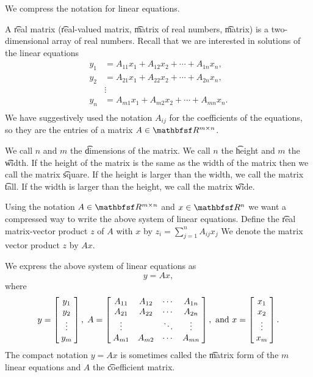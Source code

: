 
We compress the notation for linear equations.

A \t{real matrix} (\t{real-valued matrix}, \t{matrix of real numbers}, \t{matrix}) is a two-dimensional array of real numbers.
Recall that we are interested in solutions of the linear equations
  \[
\begin{aligned}
y_1 &= A_{11}x_1 + A_{12}x_2 + \cdots + A_{1n}x_n, \\
y_2 &= A_{21}x_1 + A_{22}x_2 + \cdots + A_{2n}x_n, \\
&\vdots \\
y_n &= A_{m1}x_1 + A_{m2}x_2 + \cdots + A_{mn}x_n. \\
\end{aligned}
  \]
We have suggestively used the notation $A_{ij}$ for the coefficients of the equations, so they are the entries of a matrix $A \in \R^{m \times n}$.

We call $n$ and $m$ the \t{dimensions} of the matrix.
We call $n$ the \t{height} and $m$ the \t{width}.
If the height of the matrix is the same as the width of the matrix then we call the matrix \t{square}.
If the height is larger than the width, we call the matrix \t{tall}.
If the width is larger than the height, we call the matrix \t{wide}.

Using the notation $A \in \R^{m \times n}$ and $x \in \R^n$ we want a compressed way to write the above system of linear equations.
Define the \t{real matrix-vector product} $z$ of $A$ with $x$ by $z_{i} = \sum_{j = 1}^{n} A_{ij}x_j$
We denote the matrix vector product $z$ by $Ax$.

We express the above system of linear equations as
  \[
y = Ax,
  \]
where {\small
  \[
y = \bmat{y_1 \\ y_2 \\ \vdots \\ y_m}, \;
A = \bmat{
A_{11} & A_{12} & \cdots & A_{1n} \\
A_{21} & A_{22} & \cdots & A_{2n} \\
\vdots & & \ddots & \vdots \\
A_{m1} & A_{m2} & \cdots & A_{mn} \\
}, \text{ and }
x = \bmat{x_1 \\ x_2 \\ \vdots \\ x_m}.
  \]
}
The compact notation $y = Ax$ is sometimes called the \t{matrix form} of the $m$ linear equations and $A$ the \t{coefficient matrix}.

